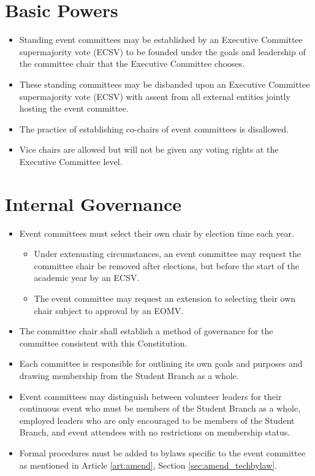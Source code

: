 \documentclass[12pt]{constitution}
\begin{document}
\label{art:event}

\section{Basic Powers}
\label{sec:event_pow}
\begin{itemize}
    \item Standing event committees may be established by an Executive Committee supermajority vote (ECSV) to be founded under the goals and leadership of the committee chair that the Executive Committee chooses.
    \item These standing committees may be disbanded upon an Executive Committee supermajority vote (ECSV) with assent from all external entities jointly hosting the event committee.
    \item The practice of establishing co-chairs of event committees is disallowed.
    \item Vice chairs are allowed but will not be given any voting rights at the Executive Committee level.
\end{itemize}

\section{Internal Governance}
\label{sec:event_govern}
\begin{itemize}
    \item Event committees must select their own chair by election time each year.
	\begin{itemize}
	\item Under extenuating circumstances, an event committee may request the committee chair be removed after elections, but before the start of the academic year by an ECSV.
	\item The event committee may request an extension to selecting their own chair subject to approval by an EOMV.
	\end{itemize}
    \item The committee chair shall establish a method of governance for the committee consistent with this Constitution.
    \item Each committee is responsible for outlining its own goals and purposes and drawing membership from the Student Branch as a whole.
    \item Event committees may distinguish between volunteer leaders for their continuous event who must be members of the Student Branch as a whole, employed leaders who are only encouraged to be members of the Student Branch, and event attendees with no restrictions on membership status.
    \item Formal procedures must be added to bylaws specific to the event committee as mentioned in Article \ref{art:amend}, Section \ref{sec:amend_techbylaw}.
\end{itemize}
\end{document}
